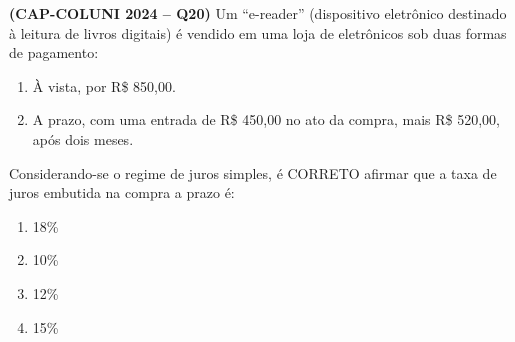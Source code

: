 \textbf{(CAP-COLUNI 2024 -- Q20)} Um ``e-reader'' (dispositivo eletrônico destinado à leitura de livros digitais) é vendido em uma loja de eletrônicos sob duas formas de pagamento:

\begin{enumerate}[label=\Roman*.]
\item À vista, por R\$ 850,00.
\item A prazo, com uma entrada de R\$ 450,00 no ato da compra, mais R\$ 520,00, após dois meses.
\end{enumerate}

Considerando-se o regime de juros simples, é CORRETO afirmar que a taxa de juros embutida na compra a prazo é:

\begin{enumerate}
	\item 18\%
	\item 10\%
	\item 12\%
	\item 15\%
\end{enumerate}
